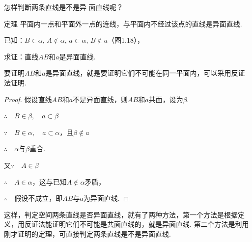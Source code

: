 怎样判断两条直线是不是异
面直线呢？

\begin{thm}
    {定理} 平面内一点和平面外一点的连线，与平面内不经过该点的直线是异面直线.
\end{thm}

已知：$B\in \alpha$, $A\notin \alpha$, $a\subset\alpha$, $B\notin a$（图1.18），

求证：直线$AB$和$a$是异面直线.

\begin{analyze}
    要证明$AB$和$a$是异面直线，就是要证明它们不可能在同一平面内，可以采用反证法证明.
\end{analyze}

\begin{proof}
假设直线$AB$和$a$不是异面直线，则$AB$和$a$共面，设为$\beta$.

\noindent
\begin{minipage}{.61\textwidth}\CTEXindent
$\therefore\quad B\in\beta,\quad a\subset \beta$

$\because\quad B\in\alpha,\quad a\subset\alpha$，且$\beta\notin a$

$\therefore\quad \alpha$与$\beta$重合.

又$\because\quad A\in\beta$

$\therefore\quad A\in \alpha$，这与已知$A\notin\alpha$矛盾，

$\therefore\quad $假设不成立，即$AB$与$a$为异面直线. 
\end{minipage}
\hfill
\begin{minipage}{.34\textwidth}
\centering
{}
\end{minipage}

\end{proof}

这样，判定空间两条直线是否异面直线，就有了两种方法，第一个方法是根据定义，用反证法能证明它们不可能是共面直线的，就是异面直线. 第二个方法是利用刚才证明的定理，可直接判定两条直线是不是异面直线.


